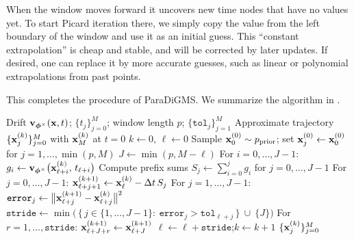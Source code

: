 When the window moves forward it uncovers new time nodes that
have no values yet. To start Picard iteration there, we simply copy the value
from the left boundary of the window and use it as an initial guess. This
``constant extrapolation'' is cheap and stable, and will be corrected by later
updates. If desired, one can replace it by more accurate guesses, such as linear
or polynomial extrapolations from past points.

This completes the procedure of ParaDiGMS. We summarize the algorithm in .


\begin{algorithm}[t]
  \caption{ParaDiGMS with Sliding Windows}
  \label{alg:paradigms}
  \begin{algorithmic}[1]
    \Require Drift ${\mathbf{v}}_{{\bm{\phi}}^\times}({\mathbf{x}},t)$; $\{t_j\}_{j=0}^{M}$; window length $p$; $\{\mathtt{tol}_j\}_{j=1}^{M}$
    \Ensure Approximate trajectory $\{{\mathbf{x}}^{(k)}_j\}_{j=0}^{M}$ with ${\mathbf{x}}^{(k)}_M$ at $t=0$
    \State $k \gets 0$, $\ell \gets 0$ 
    \State Sample ${\mathbf{x}}^{(0)}_0 \sim p_{\mathrm{prior}}$; set ${\mathbf{x}}^{(0)}_j \gets {\mathbf{x}}^{(0)}_0$ for $j=1,\ldots,\min(p,M)$  \Statex {}
      \State $J \gets \min(p,  M-\ell)$   
      \State {} 
      \State For $i=0,\ldots,J-1$: $g_i \gets {\mathbf{v}}_{{\bm{\phi}}^\times} \big({\mathbf{x}}^{(k)}_{\ell+i},\, t_{\ell+i}\big)$ 
      \Statex {}
      \State Compute prefix sums $S_j \gets \sum_{i=0}^{j} g_i$ for $j=0,\ldots,J-1$ 
      \Statex {}
      \State {} 
      \State For $j=0,\ldots,J-1$: $\displaystyle {\mathbf{x}}^{(k+1)}_{\ell+j+1} \gets {\mathbf{x}}^{(k)}_{\ell} - \Delta t\, S_j$ 
      \Statex {}
      \State {} 
      \State For $j=1,\ldots,J-1$: $\mathtt{error}_j \gets \big\|{\mathbf{x}}^{(k+1)}_{\ell+j}-{\mathbf{x}}^{(k)}_{\ell+j}\big\|^2$ \Statex {}
      \State $\displaystyle \mathtt{stride} \gets \min \Big(\,\{\,j\in\{1,\ldots,J-1\}:~\mathtt{error}_j>\mathtt{tol}_{\ell+j}\,\}\ \cup\ \{J\}\Big)$
      \State {} 
      \State For $r=1,\ldots,\mathtt{stride}$: ${\mathbf{x}}^{(k+1)}_{\ell+J+r} \gets {\mathbf{x}}^{(k+1)}_{\ell+J}$ 
      \Statex {}
      \State $\ell \gets \ell + \mathtt{stride}$;\quad $k \gets k+1$
    \EndWhile
    \State \Return $\{{\mathbf{x}}^{(k)}_j\}_{j=0}^{M}$
  \end{algorithmic}
\end{algorithm}




